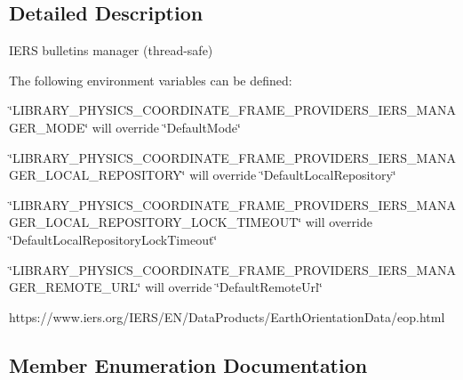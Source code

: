 \subsection{Detailed Description}
I\+E\+RS bulletins manager (thread-\/safe) 

The following environment variables can be defined\+:


\begin{DoxyItemize}
\item \char`\"{}\+L\+I\+B\+R\+A\+R\+Y\+\_\+\+P\+H\+Y\+S\+I\+C\+S\+\_\+\+C\+O\+O\+R\+D\+I\+N\+A\+T\+E\+\_\+\+F\+R\+A\+M\+E\+\_\+\+P\+R\+O\+V\+I\+D\+E\+R\+S\+\_\+\+I\+E\+R\+S\+\_\+\+M\+A\+N\+A\+G\+E\+R\+\_\+\+M\+O\+D\+E\char`\"{} will override \char`\"{}\+Default\+Mode\char`\"{}
\item \char`\"{}\+L\+I\+B\+R\+A\+R\+Y\+\_\+\+P\+H\+Y\+S\+I\+C\+S\+\_\+\+C\+O\+O\+R\+D\+I\+N\+A\+T\+E\+\_\+\+F\+R\+A\+M\+E\+\_\+\+P\+R\+O\+V\+I\+D\+E\+R\+S\+\_\+\+I\+E\+R\+S\+\_\+\+M\+A\+N\+A\+G\+E\+R\+\_\+\+L\+O\+C\+A\+L\+\_\+\+R\+E\+P\+O\+S\+I\+T\+O\+R\+Y\char`\"{} will override \char`\"{}\+Default\+Local\+Repository\char`\"{}
\item \char`\"{}\+L\+I\+B\+R\+A\+R\+Y\+\_\+\+P\+H\+Y\+S\+I\+C\+S\+\_\+\+C\+O\+O\+R\+D\+I\+N\+A\+T\+E\+\_\+\+F\+R\+A\+M\+E\+\_\+\+P\+R\+O\+V\+I\+D\+E\+R\+S\+\_\+\+I\+E\+R\+S\+\_\+\+M\+A\+N\+A\+G\+E\+R\+\_\+\+L\+O\+C\+A\+L\+\_\+\+R\+E\+P\+O\+S\+I\+T\+O\+R\+Y\+\_\+\+L\+O\+C\+K\+\_\+\+T\+I\+M\+E\+O\+U\+T\char`\"{} will override \char`\"{}\+Default\+Local\+Repository\+Lock\+Timeout\char`\"{}
\item \char`\"{}\+L\+I\+B\+R\+A\+R\+Y\+\_\+\+P\+H\+Y\+S\+I\+C\+S\+\_\+\+C\+O\+O\+R\+D\+I\+N\+A\+T\+E\+\_\+\+F\+R\+A\+M\+E\+\_\+\+P\+R\+O\+V\+I\+D\+E\+R\+S\+\_\+\+I\+E\+R\+S\+\_\+\+M\+A\+N\+A\+G\+E\+R\+\_\+\+R\+E\+M\+O\+T\+E\+\_\+\+U\+R\+L\char`\"{} will override \char`\"{}\+Default\+Remote\+Url\char`\"{}
\end{DoxyItemize}

https\+://www.iers.\+org/\+I\+E\+R\+S/\+E\+N/\+Data\+Products/\+Earth\+Orientation\+Data/eop.html 

\subsection{Member Enumeration Documentation}
\mbox{\label{classostk_1_1physics_1_1coord_1_1frame_1_1provider_1_1iers_1_1_manager_a3a8dd1081d1094069417687b4a3f16ba}} 
